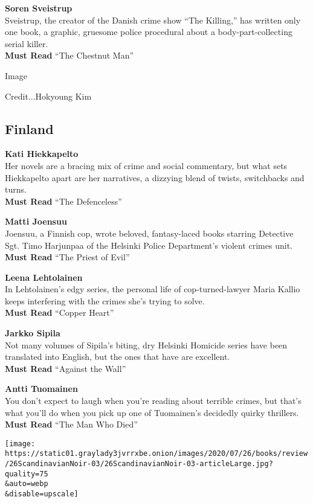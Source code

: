 \textbf{Soren Sveistrup}\\
Sveistrup, the creator of the Danish crime show ``The Killing,'' has
written only one book, a graphic, gruesome police procedural about a
body-part-collecting serial killer.\\
\textbf{Must Read} ``The Chestnut Man''

Image

Credit...Hokyoung Kim

\hypertarget{finland}{%
\subsection{Finland}\label{finland}}

\textbf{Kati Hiekkapelto}\\
Her novels are a bracing mix of crime and social commentary, but what
sets Hiekkapelto apart are her narratives, a dizzying blend of twists,
switchbacks and turns.\\
\textbf{Must Read} ``The Defenceless''

\textbf{Matti Joensuu}\\
Joensuu, a Finnish cop, wrote beloved, fantasy-laced books starring
Detective Sgt. Timo Harjunpaa of the Helsinki Police Department's
violent crimes unit.\\
\textbf{Must Read} ``The Priest of Evil''

\textbf{Leena Lehtolainen}\\
In Lehtolainen's edgy series, the personal life of cop-turned-lawyer
Maria Kallio keeps interfering with the crimes she's trying to solve.\\
\textbf{Must Read} ``Copper Heart''

\textbf{Jarkko Sipila}\\
Not many volumes of Sipila's biting, dry Helsinki Homicide series have
been translated into English, but the ones that have are excellent.\\
\textbf{Must Read} ``Against the Wall''

\textbf{Antti Tuomainen}\\
You don't expect to laugh when you're reading about terrible crimes, but
that's what you'll do when you pick up one of Tuomainen's decidedly
quirky thrillers.\\
\textbf{Must Read} ``The Man Who Died''

\texttt{[image: https://static01.graylady3jvrrxbe.onion/images/2020/07/26/books/review/26ScandinavianNoir-03/26ScandinavianNoir-03-articleLarge.jpg?quality=75\\\&auto=webp\\\&disable=upscale]}

